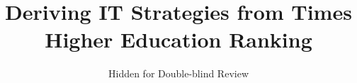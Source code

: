 \documentclass[sigconf]{acmart}
\begin{document}
\title{Deriving IT Strategies from Times Higher Education Ranking}


\author{Hidden for Double-blind Review}


%
%
%
%
%
%
%
\end{document}
